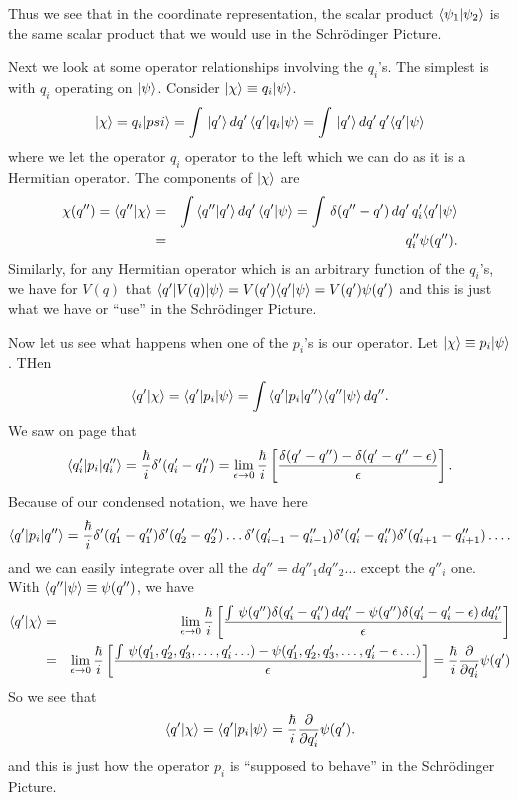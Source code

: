 Thus we see that in the coordinate representation, the scalar product $\langle \psi_1|\psi_2\rangle$  is the same scalar product that we would use in the Schr\"odinger Picture. 

Next we look at some operator relationships involving the $q_i$'s. The simplest is with $q_i$ operating on $|\psi\rangle$. Consider $|\chi\rangle \equiv q_i |\psi\rangle$. 
$$|\chi\rangle = q_i|psi\rangle = \int\, |q'\rangle\, dq'\, \langle q'| q_i| \psi \rangle = \int\, |q'\rangle\, dq'\, q' \langle q'|\psi\rangle $$ where we let the operator $q_i$ operator to the left which we can 
do as it is a Hermitian operator. The components of $|\chi\rangle$ are
\begin{eqnarray*}
\chi(q'') = \langle q''|\chi\rangle &=&\int\, \langle q''|q'\rangle\, dq'\, \langle q'|\psi\rangle = \int\, \delta(q''-q')\, dq'\, q'_i\langle q'|\psi\rangle \\
&=& q''_i \psi(q'').
\end{eqnarray*}
Similarly, for any Hermitian operator which is an arbitrary function of the $q_i$'s, we have
for $V(q)$ that $\langle q'| V(q)| \psi \rangle = V(q')\langle q'|\psi\rangle = V(q')\psi(q')$ and this is just what we have or ``use'' in the Schr\"odinger Picture. 

Now let us see what happens when one of the $p_i$'s is our operator. Let $|\chi\rangle \equiv p_i|\psi\rangle$. THen 
$$\langle q'|\chi\rangle = \langle q'| p_i| \psi \rangle = \int\, \langle q'| p_i| q'' \rangle\langle q''|\psi\rangle\, dq''.$$
We saw on page  that 
$$\langle q'_i| p_i| q_i'' \rangle = {\hbar\over i} \delta'(q_i'-q_I'')  = \lim_{\epsilon\rightarrow 0} {\hbar\over i} \left[ {\delta(q'-q'') - \delta(q'-q''-\epsilon)\over \epsilon}\right].$$ 
Because of our condensed notation, we have here 
$$\langle q'| p_i| q'' \rangle = {\hbar\over i} \delta'(q_1'-q_1'')\delta'(q_2'-q_2'')\hdots\delta'(q_{i-1}'-q_{i-1}'')\delta'(q_i'-q_i'') \delta'(q_{i+1}'-q_{i+1}'') \hdots.$$ 
and we can easily integrate over all the $dq'' = dq''_1dq''_2\hdots$ except the $q''_i$ one. With $\langle q''|\psi\rangle \equiv \psi(q'')$, we have
\begin{eqnarray*}
\langle q'|\chi\rangle &=& \lim_{\epsilon\rightarrow 0} {\hbar\over i} \left[{\int\, \psi(q'')\delta(q'_i-q''_i)\, dq''_i - \psi(q'')\delta(q'_i-q'_i -\epsilon)\,dq''_i\over \epsilon}\right]\\
                         &=& \lim_{\epsilon\rightarrow 0} {\hbar\over i} \left[{\int\, \psi(q'_1,q'_2,q'_3,\hdots,q'_i\hdots) - \psi(q'_1,q'_2,q'_3,\hdots,q'_i-\epsilon\hdots) \over \epsilon}\right] ={\hbar\over i} {\partial\over\partial q'_i}\psi(q')
\end{eqnarray*}
So we see that 
$$\langle q'|\chi\rangle = \langle q'| p_i| \psi \rangle = {\hbar\over i} {\partial\over\partial q'_i}\psi(q').$$
and this is just how the operator $p_i$ is ``supposed to behave'' in the Schr\"odinger Picture. 

